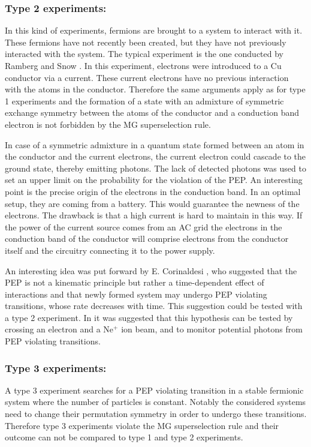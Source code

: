 \subsubsection{Type 2 experiments:}

In this kind of experiments, fermions are brought to a system to interact with it. These fermions have not recently been created, but they have not previously interacted with the system. The typical experiment is the one conducted by Ramberg and Snow \cite{RAMBERG1990}. In this experiment, electrons were introduced to a Cu conductor via a current. These current electrons have no previous interaction with the atoms in the conductor. Therefore the same arguments apply as for type 1 experiments and the formation of a state with an admixture of symmetric exchange symmetry between the atoms of the conductor and a conduction band electron is not forbidden by the MG superselection rule. 

In case of a symmetric admixture in a quantum state formed between an atom in the conductor and the current electrons, the current electron could cascade to the ground state, thereby emitting photons. The lack of detected photons was used to set an upper limit on the probability for the violation of the PEP. An interesting point is the precise origin of the electrons in the conduction band. In an optimal setup, they are coming from a battery. This would guarantee the newness of the electrons. The drawback is that a high current is hard to maintain in this way. If the power of the current source comes from an AC grid the electrons in the conduction band of the conductor will comprise electrons from the conductor itself and the circuitry connecting it to the power supply.

An interesting idea was put forward by E. Corinaldesi \cite{Corinaldesi1967}, who suggested that the PEP is not a kinematic principle but rather a time-dependent effect of interactions and that newly formed system may undergo PEP violating transitions, whose rate decreases with time. This suggestion could be tested with a type 2 experiment. In \cite{Shimony2006} it was suggested that this hypothesis can be tested by crossing an electron and a Ne$^{+}$ ion beam, and to monitor potential photons from PEP violating transitions.

\subsubsection{Type 3 experiments:}

A type 3 experiment searches for a PEP violating transition in a stable fermionic system where the number of particles is constant. Notably the considered systems need to change their permutation symmetry in order to undergo these transitions. Therefore type 3 experiments violate the MG superselection rule and their outcome can not be compared to type 1 and type 2 experiments. 

